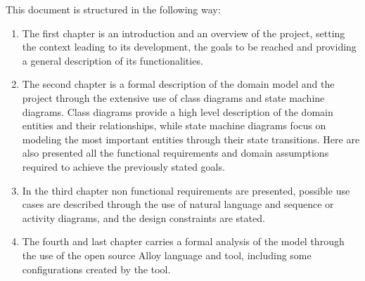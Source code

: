 \documentclass[../../main.tex]{subfiles}
\begin{document}
This document is structured in the following way:

\begin{enumerate}
    \item The first chapter is an introduction and an overview of the project, setting the context leading to its development, 
          the goals to be reached and providing a general description of its functionalities.

    \item The second chapter is a formal description of the domain model and the project through the extensive use of class diagrams and state machine diagrams. 
          Class diagrams provide a high level description of the domain entities and their relationships, while state machine diagrams focus on modeling the most important 
          entities through their state transitions. Here are also presented all the functional requirements and domain assumptions required to achieve the previously stated goals.

    \item In the third chapter non functional requirements are presented, possible use cases are described through the use of natural language and sequence or activity diagrams, 
          and the design constraints are stated. 

    \item The fourth and last chapter carries a formal analysis of the model through the use of the open source Alloy language and tool, 
          including some configurations created by the tool.
\end{enumerate}
\end{document}
